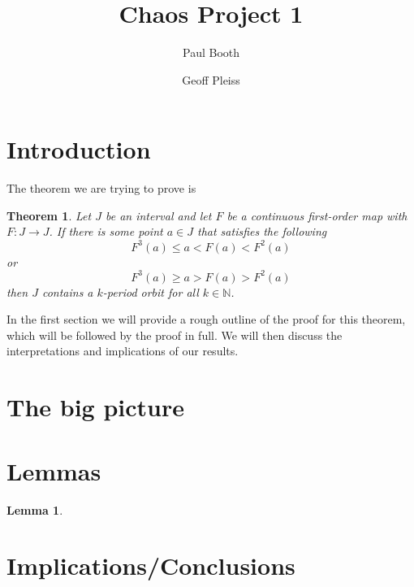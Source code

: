\documentclass[12pt]{IEEEtran}
\title{Chaos Project 1}
\author{
  Paul Booth \\
  \and
  Geoff Pleiss
}
\date{}
\newtheorem{thm}{Theorem}
\newtheorem{lma}{Lemma}
\begin{document}
  \maketitle 

\begin{abstract}
\end{abstract}



\section{Introduction}

The theorem we are trying to prove is

\begin{thm}
\label{mainthm}
	Let $J$ be an interval and let $F$ be a continuous first-order map with $F : J \rightarrow J$. If there is some point $a \in J$ that satisfies the following
	\[ F^3\left(a\right) \leq a < F\left(a\right) < F^2\left(a\right) \]
	or
	\[ F^3\left(a\right) \geq a > F\left(a\right) > F^2\left(a\right) \]
	then $J$ contains a $k$-period orbit for all $k \in \mathbb{N}$.
\end{thm}

In the first section we will provide a rough outline of the proof for this theorem, which will be followed by the proof in full. We will then discuss the interpretations and implications of our results.

\section{The big picture}




\section{Lemmas}

\begin{lma}
\end{lma}




\section{Implications/Conclusions}
\end{document}
